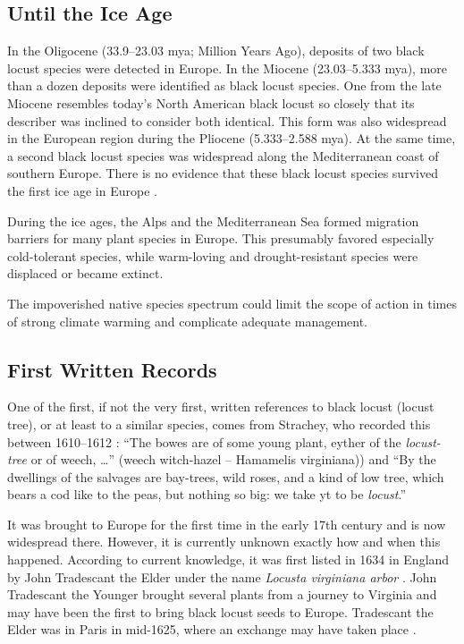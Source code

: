 \subsection{Until the Ice Age}

In the Oligocene (33.9–23.03 mya; Million Years Ago), deposits of two black locust species were detected in Europe. In the Miocene (23.03–5.333 mya), more than a dozen deposits were identified as black locust species. One from the late Miocene resembles today’s North American black locust so closely that its describer was inclined to consider both identical. This form was also widespread in the European region during the Pliocene (5.333–2.588 mya). At the same time, a second black locust species was widespread along the Mediterranean coast of southern Europe. There is no evidence that these black locust species survived the first ice age in Europe \citep{berry1918robinie}.

During the ice ages, the Alps and the Mediterranean Sea formed migration barriers for many plant species in Europe. This presumably favored especially cold-tolerant species, while warm-loving and drought-resistant species were displaced or became extinct.

The impoverished native species spectrum could limit the scope of action in times of strong climate warming and complicate adequate management.

\subsection{First Written Records}

One of the first, if not the very first, written references to black locust (locust tree), or at least to a similar species, comes from Strachey, who recorded this between 1610–1612 \citep{strachey1610-1612historie}: \enquote{The bowes are of some young plant, eyther of the \emph{locust-tree} or of weech, \dots} (weech witch-hazel -- Hamamelis virginiana)) and \enquote{By the dwellings of the salvages are bay-trees, wild roses, and a kind of low tree, which bears a cod like to the peas, but nothing so big: we take yt to be \emph{locust}.}

It was brought to Europe for the first time in the early 17th century and is now widespread there. However, it is currently unknown exactly how and when this happened. According to current knowledge, it was first listed in 1634 in England by John Tradescant the Elder under the name \emph{Locusta virginiana arbor} \citep[p.~339]{gunther1922botanists}. John Tradescant the Younger brought several plants from a journey to Virginia and may have been the first to bring black locust seeds to Europe. Tradescant the Elder was in Paris in mid-1625, where an exchange may have taken place \citep{ginter2022robinieGeschichte}.

